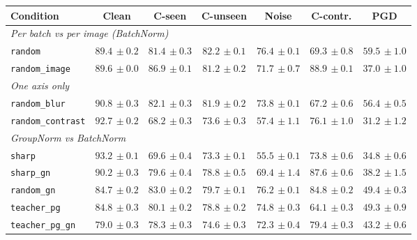 \begin{tabular}{lcccccc}
\hline
Condition & Clean & C-seen & C-unseen & Noise & C-contr. & PGD \\
\hline
\multicolumn{7}{l}{\textit{Per batch vs per image (BatchNorm)}} \\
\texttt{random} & $89.4{\scriptstyle\,\pm0.2}$ & $81.4{\scriptstyle\,\pm0.3}$ & $82.2{\scriptstyle\,\pm0.1}$ & $76.4{\scriptstyle\,\pm0.1}$ & $69.3{\scriptstyle\,\pm0.8}$ & $59.5{\scriptstyle\,\pm1.0}$ \\
\texttt{random\_image} & $89.6{\scriptstyle\,\pm0.0}$ & $86.9{\scriptstyle\,\pm0.1}$ & $81.2{\scriptstyle\,\pm0.2}$ & $71.7{\scriptstyle\,\pm0.7}$ & $88.9{\scriptstyle\,\pm0.1}$ & $37.0{\scriptstyle\,\pm1.0}$ \\
\multicolumn{7}{l}{\textit{One axis only}} \\
\texttt{random\_blur} & $90.8{\scriptstyle\,\pm0.3}$ & $82.1{\scriptstyle\,\pm0.3}$ & $81.9{\scriptstyle\,\pm0.2}$ & $73.8{\scriptstyle\,\pm0.1}$ & $67.2{\scriptstyle\,\pm0.6}$ & $56.4{\scriptstyle\,\pm0.5}$ \\
\texttt{random\_contrast} & $92.7{\scriptstyle\,\pm0.2}$ & $68.2{\scriptstyle\,\pm0.3}$ & $73.6{\scriptstyle\,\pm0.3}$ & $57.4{\scriptstyle\,\pm1.1}$ & $76.1{\scriptstyle\,\pm1.0}$ & $31.2{\scriptstyle\,\pm1.2}$ \\
\multicolumn{7}{l}{\textit{GroupNorm vs BatchNorm}} \\
\texttt{sharp} & $93.2{\scriptstyle\,\pm0.1}$ & $69.6{\scriptstyle\,\pm0.4}$ & $73.3{\scriptstyle\,\pm0.1}$ & $55.5{\scriptstyle\,\pm0.1}$ & $73.8{\scriptstyle\,\pm0.6}$ & $34.8{\scriptstyle\,\pm0.6}$ \\
\texttt{sharp\_gn} & $90.2{\scriptstyle\,\pm0.3}$ & $79.6{\scriptstyle\,\pm0.4}$ & $78.8{\scriptstyle\,\pm0.5}$ & $69.4{\scriptstyle\,\pm1.4}$ & $87.6{\scriptstyle\,\pm0.6}$ & $38.2{\scriptstyle\,\pm1.5}$ \\
\texttt{random\_gn} & $84.7{\scriptstyle\,\pm0.2}$ & $83.0{\scriptstyle\,\pm0.2}$ & $79.7{\scriptstyle\,\pm0.1}$ & $76.2{\scriptstyle\,\pm0.1}$ & $84.8{\scriptstyle\,\pm0.2}$ & $49.4{\scriptstyle\,\pm0.3}$ \\
\texttt{teacher\_pg} & $84.8{\scriptstyle\,\pm0.3}$ & $80.1{\scriptstyle\,\pm0.2}$ & $78.8{\scriptstyle\,\pm0.2}$ & $74.8{\scriptstyle\,\pm0.3}$ & $64.1{\scriptstyle\,\pm0.3}$ & $49.3{\scriptstyle\,\pm0.9}$ \\
\texttt{teacher\_pg\_gn} & $79.0{\scriptstyle\,\pm0.3}$ & $78.3{\scriptstyle\,\pm0.3}$ & $74.6{\scriptstyle\,\pm0.3}$ & $72.3{\scriptstyle\,\pm0.4}$ & $79.4{\scriptstyle\,\pm0.3}$ & $43.2{\scriptstyle\,\pm0.6}$ \\

\end{tabular}
